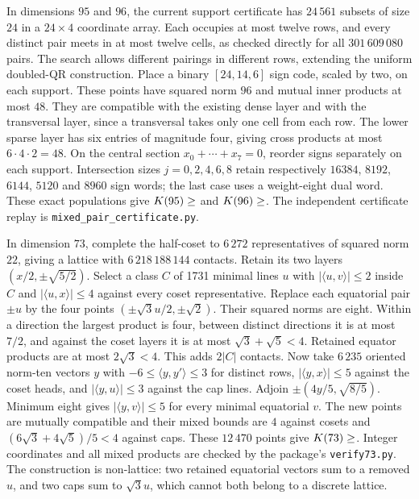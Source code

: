 \documentclass[11pt]{amsart}
\theoremstyle{remark}
\newcommand{\ip}[2]{\langle #1,#2\rangle}
\begin{document}
In dimensions $95$ and $96$, the current support certificate has
$24\,561$ subsets of size $24$ in a $24\times4$ coordinate array. Each occupies
at most twelve rows, and every distinct pair meets in at most twelve cells,
as checked directly for all $301\,609\,080$ pairs. The search allows different
pairings in different rows, extending the uniform doubled-QR construction.
Place a binary $[24,14,6]$ sign code, scaled by two, on each support.
These points have squared norm $96$ and mutual inner products at most $48$.
They are compatible with the existing dense layer and with the transversal
layer, since a transversal takes only one cell from each row. The lower sparse
layer has six entries of magnitude four, giving cross products at most
$6\cdot4\cdot2=48$. On the central section
$x_0+\cdots+x_7=0$, reorder signs separately on each support.
Intersection sizes $j=0,2,4,6,8$ retain respectively
$16384$, $8192$, $6144$, $5120$ and $8960$ sign words; the last case uses a weight-eight
dual word. These exact populations give $K(95)\ge\Kcur{95}$ and
$K(96)\ge\Kcur{96}$. The independent certificate replay is
\texttt{mixed\_pair\_certificate.py}.

In dimension $73$, complete the half-coset to $6\,272$ representatives
of squared norm $22$, giving a lattice with $6\,218\,188\,144$ contacts.
Retain its two layers $(x/2,\pm\sqrt{5/2})$. Select a class $C$ of 1731
minimal lines $u$ with $|\ip{u}{v}|\le2$ inside $C$ and
$|\ip{u}{x}|\le4$ against every coset representative. Replace each equatorial
pair $\pm u$ by the four points $(\pm\sqrt{3}u/2,\pm\sqrt{2})$.
Their squared norms are eight. Within a direction the largest product is
four, between distinct directions it is at most $7/2$, and against the
coset layers it is at most $\sqrt{3}+\sqrt{5}<4$. Retained equator products
are at most $2\sqrt{3}<4$. This adds $2|C|$ contacts. Now take $6\,235$
oriented norm-ten vectors $y$ with $-6\le\ip{y}{y'}\le3$ for distinct
rows, $|\ip{y}{x}|\le5$ against the coset heads, and
$|\ip{y}{u}|\le3$ against the cap lines. Adjoin
$\pm(4y/5,\sqrt{8/5})$. Minimum eight gives
$|\ip{y}{v}|\le5$ for every minimal equatorial $v$. The new points
are mutually compatible and their mixed bounds are $4$ against cosets
and $(6\sqrt{3}+4\sqrt{5})/5<4$ against caps. These $12\,470$ points
give $K(73)\ge\Kcur{73}$. Integer coordinates and all mixed products are checked
by the package's \texttt{verify73.py}. The construction is non-lattice:
two retained equatorial vectors sum to a removed $u$, and two caps sum to
$\sqrt{3}u$, which cannot both belong to a discrete lattice.
\end{document}
